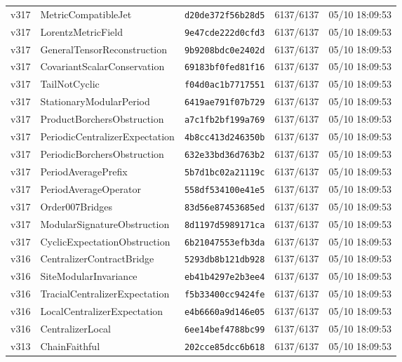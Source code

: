 \documentclass[11pt]{article}
\theoremstyle{definition}\newtheorem{deriv}{Derivation}
\begin{document}
{\begin{longtable}{@{}lllll@{}}
v317 & MetricCompatibleJet & \texttt{d20de372f56b28d5} & 6137/6137 & 05/10 18:09:53 \\
v317 & LorentzMetricField & \texttt{9e47cde222d0cfd3} & 6137/6137 & 05/10 18:09:53 \\
v317 & GeneralTensorReconstruction & \texttt{9b9208bdc0e2402d} & 6137/6137 & 05/10 18:09:53 \\
v317 & CovariantScalarConservation & \texttt{69183bf0fed81f16} & 6137/6137 & 05/10 18:09:53 \\
v317 & TailNotCyclic & \texttt{f04d0ac1b7717551} & 6137/6137 & 05/10 18:09:53 \\
v317 & StationaryModularPeriod & \texttt{6419ae791f07b729} & 6137/6137 & 05/10 18:09:53 \\
v317 & ProductBorchersObstruction & \texttt{a7c1fb2bf199a769} & 6137/6137 & 05/10 18:09:53 \\
v317 & PeriodicCentralizerExpectation & \texttt{4b8cc413d246350b} & 6137/6137 & 05/10 18:09:53 \\
v317 & PeriodicBorchersObstruction & \texttt{632e33bd36d763b2} & 6137/6137 & 05/10 18:09:53 \\
v317 & PeriodAveragePrefix & \texttt{5b7d1bc02a21119c} & 6137/6137 & 05/10 18:09:53 \\
v317 & PeriodAverageOperator & \texttt{558df534100e41e5} & 6137/6137 & 05/10 18:09:53 \\
v317 & Order007Bridges & \texttt{83d56e87453685ed} & 6137/6137 & 05/10 18:09:53 \\
v317 & ModularSignatureObstruction & \texttt{8d1197d5989171ca} & 6137/6137 & 05/10 18:09:53 \\
v317 & CyclicExpectationObstruction & \texttt{6b21047553efb3da} & 6137/6137 & 05/10 18:09:53 \\
v316 & CentralizerContractBridge & \texttt{5293db8b121db928} & 6137/6137 & 05/10 18:09:53 \\
v316 & SiteModularInvariance & \texttt{eb41b4297e2b3ee4} & 6137/6137 & 05/10 18:09:53 \\
v316 & TracialCentralizerExpectation & \texttt{f5b33400cc9424fe} & 6137/6137 & 05/10 18:09:53 \\
v316 & LocalCentralizerExpectation & \texttt{e4b6660a9d146e05} & 6137/6137 & 05/10 18:09:53 \\
v316 & CentralizerLocal & \texttt{6ee14bef4788bc99} & 6137/6137 & 05/10 18:09:53 \\
v313 & ChainFaithful & \texttt{202cce85dcc6b618} & 6137/6137 & 05/10 18:09:53 \\

\end{longtable}}
\end{document}
